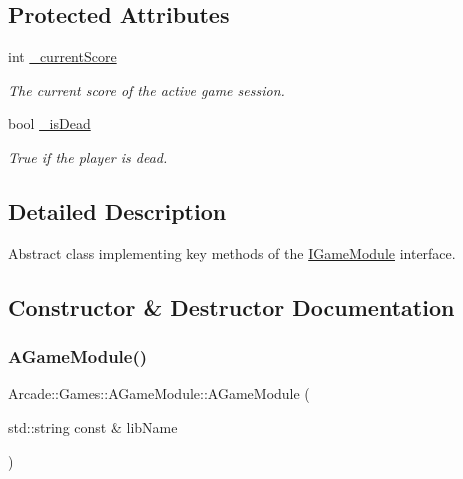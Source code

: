\subsection*{Protected Attributes}
\begin{DoxyCompactItemize}
\item 
\mbox{\label{classArcade_1_1Games_1_1AGameModule_aec19427e257bb35879871c6853f51a8f}} 
int \mbox{\hyperlink{classArcade_1_1Games_1_1AGameModule_aec19427e257bb35879871c6853f51a8f}{\+\_\+current\+Score}}
\begin{DoxyCompactList}\small\item\em The current score of the active game session. \end{DoxyCompactList}\item 
\mbox{\label{classArcade_1_1Games_1_1AGameModule_a0f22ebc10582d404cf7393d8028cb0c2}} 
bool \mbox{\hyperlink{classArcade_1_1Games_1_1AGameModule_a0f22ebc10582d404cf7393d8028cb0c2}{\+\_\+is\+Dead}}
\begin{DoxyCompactList}\small\item\em True if the player is dead. \end{DoxyCompactList}\end{DoxyCompactItemize}


\subsection{Detailed Description}
Abstract class implementing key methods of the \mbox{\hyperlink{classArcade_1_1Games_1_1IGameModule}{I\+Game\+Module}} interface. 

\subsection{Constructor \& Destructor Documentation}
\mbox{\label{classArcade_1_1Games_1_1AGameModule_a0f8d2149171d7eacf1d16a84fb0d9aa2}} 
\subsubsection{\texorpdfstring{AGameModule()}{AGameModule()}}
{\footnotesize\ttfamily Arcade\+::\+Games\+::\+A\+Game\+Module\+::\+A\+Game\+Module (\begin{DoxyParamCaption}\item[{std\+::string const \&}]{lib\+Name }\end{DoxyParamCaption})}



